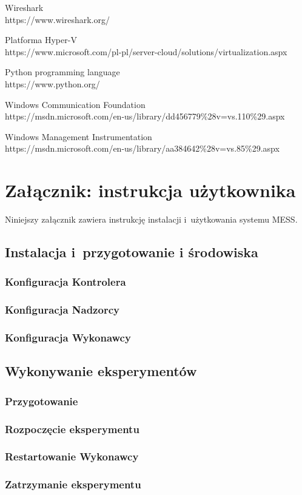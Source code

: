 \documentclass[a4paper,12pt,oneside]{article}
\begin{document}
\begin{thebibliography}{99}
	 Wireshark \\
		https://www.wireshark.org/
		
	 Platforma Hyper-V \\
		https://www.microsoft.com/pl-pl/server-cloud/solutions/virtualization.aspx
	
	 Python programming language \\
		https://www.python.org/
		
	 Windows Communication Foundation \\
		https://msdn.microsoft.com/en-us/library/dd456779\%28v=vs.110\%29.aspx
					
	 Windows Management Instrumentation \\
		https://msdn.microsoft.com/en-us/library/aa384642\%28v=vs.85\%29.aspx
					
	\end{thebibliography}	
	
	\clearpage
	\newpage	
	
	\section{Załącznik: instrukcja użytkownika}
	
	Niniejszy załącznik zawiera instrukcję instalacji i~użytkowania systemu MESS.
	
	\subsection{Instalacja i~przygotowanie i środowiska}
	
	\subsubsection{Konfiguracja Kontrolera}
	
	\subsubsection{Konfiguracja Nadzorcy}
	
	\subsubsection{Konfiguracja Wykonawcy}
	
	\subsection{Wykonywanie eksperymentów}
	
	\subsubsection{Przygotowanie}
	
	\subsubsection{Rozpoczęcie eksperymentu}

	\subsubsection{Restartowanie Wykonawcy}
	
	\subsubsection{Zatrzymanie eksperymentu}	
\end{document}

